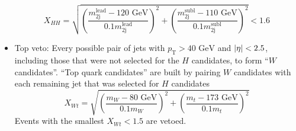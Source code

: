 \documentclass[12pt]{article}
\begin{document}
\begin{itemize}
			\[
				X_{HH} = \sqrt{\left( \frac{m_{\text{2j}}^{\text{lead}} - \text{120 GeV}}{0.1 m_{\text{2j}}^{\text{lead}}} \right)^2 + \left(\frac{m_{\text{2j}}^{\text{subl}} - \text{110 GeV}}{0.1 m_{\text{2j}}^{\text{subl}}} \right)^2} < 1.6
			\]
			\item Top veto: Every possible pair of jets with $p_\text{T} > \text{40 GeV}$ and $\abs{\eta} < 2.5$, including those that were not selected for the $H$ candidates, to form ``$W$ candidates''. ``Top quark candidates'' are built by pairing $W$ candidates with each remaining jet that was selected for $H$ candidates
			\[
				X_{Wt} = \sqrt{\left( \frac{m_{W} - \text{80 GeV}}{0.1 m_{W}} \right)^2 + \left(\frac{m_{t} - \text{173 GeV}}{0.1 m_{t}} \right)^2} 
			\] 
			Events with the smallest $X_{Wt} < 1.5$ are vetoed.

		\end{itemize}
\end{document}
